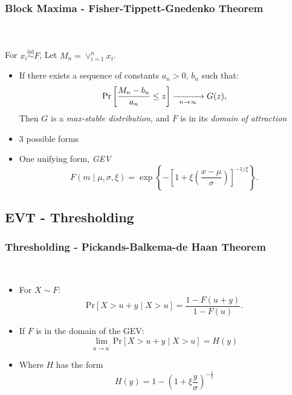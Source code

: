 \documentclass[aspectratio=169]{beamer}
\begin{document}
\begin{frame}
  \frametitle{Block Maxima - Fisher-Tippett-Gnedenko Theorem}
  {\scriptsize\cite{dehaan2006}}\\~\vspace{0.01cm}\\
  For $x_i \stackrel{\text{iid}}{\sim} F$, Let $M_n = \vee_{i=1}^n x_i$.
  \begin{itemize}
    \item If there exists a sequence of constants $a_n > 0$, $b_n$ such that:
        \begin{equation*}
            \text{Pr}\left[\frac{M_n - b_n}{a_n} \leq z\right] \xrightarrow[\enskip n\to\infty\enskip]{} G(z),
        \end{equation*}
        Then $G$ is a \emph{max-stable distribution}, and $F$ is in its \emph{domain of attraction}
    \item 3 possible forms~\citep{frechet1927,fisher1928}
    \pause
    \item One unifying form, \emph{GEV}~\citep{jenkinson1955}
      \begin{equation*}
        F(m \mid \mu, \sigma, \xi) = \exp\left\lbrace-\left[1 +
              \xi\left(\frac{x - \mu}{\sigma}\right)\right]_{}^{-1/{\xi}}\right\rbrace.
      \end{equation*}
    \end{itemize}
\end{frame} %

\subsection{EVT - Thresholding}
\begin{frame}
  \frametitle{Thresholding - Pickands-Balkema-de Haan Theorem}
  {\scriptsize\cite{dehaan2006}}\\
  \begin{itemize}
    \item For $X \sim F$:
      \begin{equation*}
        \text{Pr}\left[X > u + y\mid X > u\right] = \frac{1 - F(u + y)}{1 - F(u)}.
      \end{equation*}
    \pause
    \item If $F$ is in the domain of the GEV:
      \begin{equation*}
        \lim\limits_{u\to u^{\prime}}\text{Pr}\left[X > u + y\mid X > u\right] = H(y)
      \end{equation*}
    \pause
    \item Where $H$ has the form
      \begin{equation*}
        H(y) = 1 - \left(1 + \xi\frac{y}{\sigma}\right)^{-\frac{1}{\xi}}
      \end{equation*}
  \end{itemize}
\end{frame} %
\end{document}
